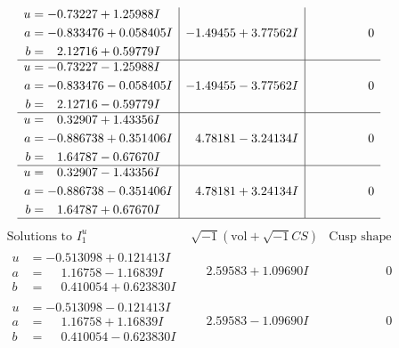 \documentclass[1p]{elsarticle_modified}
\theoremstyle{definition}
\newcommand{\I}{\sqrt{-1}}
\begin{document}
$$\begin{array}{c|c|c}
\begin{aligned}
u &= -0.73227 + 1.25988 I \\
a &= -0.833476 + 0.058405 I \\
b &= \phantom{-}2.12716 + 0.59779 I\end{aligned}
 & -1.49455 + 3.77562 I & \phantom{-0.000000 } 0 \\ \hline\begin{aligned}
u &= -0.73227 - 1.25988 I \\
a &= -0.833476 - 0.058405 I \\
b &= \phantom{-}2.12716 - 0.59779 I\end{aligned}
 & -1.49455 - 3.77562 I & \phantom{-0.000000 } 0 \\ \hline\begin{aligned}
u &= \phantom{-}0.32907 + 1.43356 I \\
a &= -0.886738 + 0.351406 I \\
b &= \phantom{-}1.64787 - 0.67670 I\end{aligned}
 & \phantom{-}4.78181 - 3.24134 I & \phantom{-0.000000 } 0 \\ \hline\begin{aligned}
u &= \phantom{-}0.32907 - 1.43356 I \\
a &= -0.886738 - 0.351406 I \\
b &= \phantom{-}1.64787 + 0.67670 I\end{aligned}
 & \phantom{-}4.78181 + 3.24134 I & \phantom{-0.000000 } 0\\
 \hline 
 \end{array}$$\newpage$$\begin{array}{c|c|c}  
\text{Solutions to }I^u_{1}& \I (\text{vol} + \sqrt{-1}CS) & \text{Cusp shape}\\
 \hline 
\begin{aligned}
u &= -0.513098 + 0.121413 I \\
a &= \phantom{-}1.16758 - 1.16839 I \\
b &= \phantom{-}0.410054 + 0.623830 I\end{aligned}
 & \phantom{-}2.59583 + 1.09690 I & \phantom{-0.000000 } 0 \\ \hline\begin{aligned}
u &= -0.513098 - 0.121413 I \\
a &= \phantom{-}1.16758 + 1.16839 I \\
b &= \phantom{-}0.410054 - 0.623830 I\end{aligned}
 & \phantom{-}2.59583 - 1.09690 I & \phantom{-0.000000 } 0 \\ \hline\begin{aligned}

\end{aligned}
\end{array}$$
\end{document}
